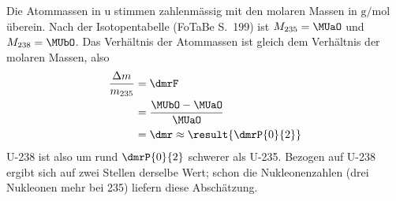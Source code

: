 Die Atommassen in $\mathrm{u}$ stimmen zahlenmässig mit den molaren Massen in $\mathrm{g/mol}$ überein. Nach der Isotopentabelle (FoTaBe S.~199) ist $M_{235} = \MUaO$ und $M_{238} = \MUbO$. Das Verhältnis der Atommassen ist gleich dem Verhältnis der molaren Massen, also
\begin{align}
 \frac{\Delta m}{m_{235}} &= \dmrF \\
   &= \frac{\MUbO-\MUaO}{\MUaO} \\
   &= \dmr \approx \result{\dmrP{0}{2}}
\end{align}
U-238 ist also um rund $\dmrP{0}{2}$ schwerer als U-235. Bezogen auf U-238 ergibt sich auf zwei Stellen derselbe Wert; schon die Nukleonenzahlen (drei Nukleonen mehr bei 235) liefern diese Abschätzung.
